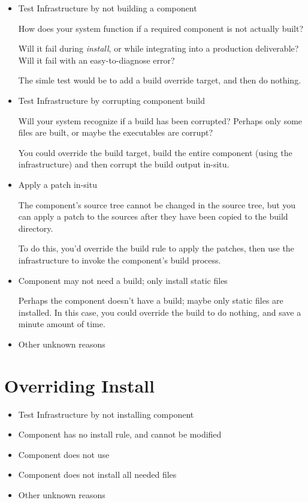 \begin{itemize}
\item Test \bni Infrastructure by not building a component

  How does your \bni system function if a required component is not
  actually built?

  Will it fail during \emph{install}, or while integrating into a
  production deliverable?  Will it fail with an easy-to-diagnose
  error?

  The simle test would be to add a build override target, and then do
  nothing.

\item Test \bni Infrastructure by corrupting component build

  Will your \bni system recognize if a build has been corrupted?
  Perhaps only some files are built, or maybe the executables are
  corrupt?

  You could override the build target, build the entire component
  (using the \lmsbw infrastructure) and then corrupt the build output
  in-situ.

\item Apply a patch in-situ

  The component's source tree cannot be changed in the source tree,
  but you can apply a patch to the sources after they have been copied to the build
  directory.

  To do this, you'd override the build rule to apply the patches, then
  use the \lmsbw infrastructure to invoke the component's build
  process.

\item Component may not need a build; only install static files

  Perhaps the component doesn't have a build; maybe only static files
  are installed.  In this case, you could override the build to do
  nothing, and save a minute amount of time.

\item Other unknown reasons
\end{itemize}

\section{Overriding Install}

\begin{itemize}
\item Test \bni Infrastructure by not installing component
\item Component \makefile has no install rule, and cannot be modified
\item Component \makefile does not use \destdir
\item Component does not install all needed files
\item Other unknown reasons
\end{itemize}

